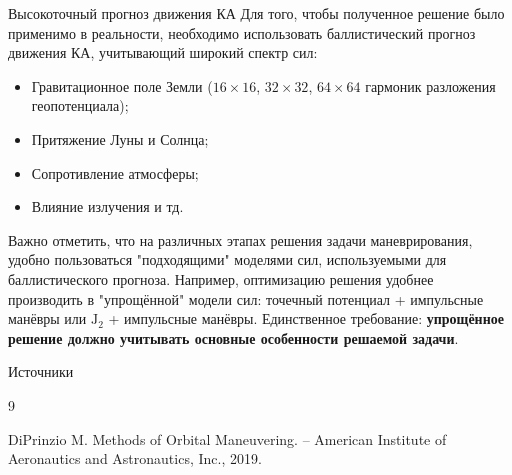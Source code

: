 \documentclass[8pt]{beamer}
\begin{document}
\begin{frame}{Высокоточный прогноз движения КА}
Для того, чтобы полученное решение было применимо в реальности, необходимо использовать баллистический прогноз движения КА, учитывающий широкий спектр сил: 
\begin{itemize}
    \item Гравитационное поле Земли ($16 \times 16$, $32 \times 32$, $64 \times 64$ гармоник разложения геопотенциала);
    \item Притяжение Луны и Солнца;
    \item Сопротивление атмосферы;
    \item Влияние излучения и тд.
\end{itemize}
Важно отметить, что на различных этапах решения задачи маневрирования, удобно пользоваться "подходящими" моделями сил, используемыми для баллистического прогноза. Например, оптимизацию решения удобнее производить в "упрощённой" модели сил: точечный потенциал + импульсные манёвры или $\text{J}_2$ + импульсные манёвры. Единственное требование: \textbf{упрощённое решение должно учитывать основные особенности решаемой задачи}. 
\end{frame}

\begin{frame}[allowframebreaks]{Источники}
  \begin{thebibliography}{9}

    DiPrinzio M. Methods of Orbital Maneuvering. – American Institute of Aeronautics and Astronautics, Inc., 2019.
    
  \end{thebibliography}
\end{frame}
\end{document}

